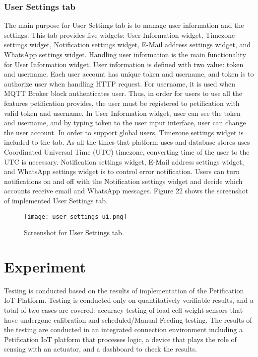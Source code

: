 \documentclass[conference]{IEEEtran}
\begin{document}
\subsubsection{User Settings tab}
The main purpose for User Settings tab is to manage user information and the settings. This tab provides five widgets: User Information widget, Timezone settings widget, Notification settings widget, E-Mail address settings widget, and WhatsApp settings widget. Handling user information is the main functionality for User Information widget. User information is defined with two value: token and username. Each user account has unique token and username, and token is to authorize user when handling HTTP request. For username, it is used when MQTT Broker block authenticates user. Thus, in order for users to use all the features petification provides, the user must be registered to petification with valid token and username. In User Information widget, user can see the token and username, and by typing token to the user input interface, user can change the user account.
\indent In order to support global users, Timezone settings widget is included to the tab. As all the times that platform uses and database stores uses Coordinated Universal Time (UTC) timezone, converting time of the user to the UTC is necessary. Notification settings widget, E-Mail address settings widget, and WhatsApp settings widget is to control error notification. Users can turn notifications on and off with the Notification settings widget and decide which accounts receive email and WhatsApp messages. Figure 22
shows the screenshot of implemented User Settings tab.

\begin{figure}[htbp]
\centerline{\texttt{[image: user\_settings\_ui.png]}}
\caption{Screenshot for User Settings tab.}
\label{fig}
\end{figure}
\section{Experiment}
Testing is conducted based on the results of implementation of the Petification IoT Platform. Testing is conducted only on quantitatively verifiable results, and a total of two cases are covered: accuracy testing of load cell weight sensors that have undergone calibration and scheduled/Manual Feeding testing. The results of the testing are conducted in an integrated connection environment including a Petification IoT platform that processes logic, a device that plays the role of sensing with an actuator, and a dashboard to check the results.
\end{document}
